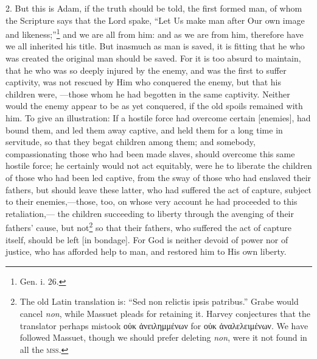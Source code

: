 2. But this is Adam, if the truth should be told, the first formed man, of whom the Scripture says that the Lord spake, “Let Us make man after Our own image and likeness;”\footnote{Gen. i. 26.} and we are all from him: and as we are from him, therefore have we all inherited his title. But inasmuch as man is saved, it is fitting that he who was created the original man should be saved. For it is too absurd to maintain, that he who was so deeply injured by the enemy, and was the first to suffer captivity, was not rescued by Him who conquered the enemy, but that his children were, —those whom he had begotten in the same captivity. Neither would the enemy appear to be as yet conquered, if the old spoils remained with him. To give an illustration: If a hostile force had overcome certain [enemies], had bound them, and led them away captive, and held them for a long time in servitude, so that they begat children among them; and somebody, compassionating those who had been made slaves, should overcome this same hostile force; he certainly would not act equitably, were he to liberate the children of those who had been led captive, from the sway of those who had enslaved their fathers, but should leave these latter, who had suffered the act of capture, subject to their enemies,—those, too, on whose very account he had proceeded to this retaliation,— the children succeeding to liberty through the avenging of their fathers’ cause, but not\footnote{The old Latin translation is: “Sed non relictis ipsis patribus.” Grabe would cancel \emph{non}, while Massuet pleads for retaining it. Harvey conjectures that the translator perhaps mistook \textgreek{οὐκ ἀνειλημμένων} for \textgreek{οὐκ ἀναλελειμένων.} We have followed Massuet, though we should prefer deleting \emph{non}, were it not found in all the \textsc{mss.}} so that their fathers, who suffered the act of capture itself, should be left [in bondage]. For God is neither devoid of power nor of justice, who has afforded help to man, and restored him to His own liberty.

